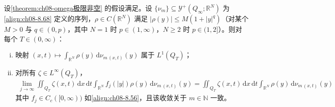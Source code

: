 \documentclass[../../main.tex]{subfiles}%
\begin{document}
\begin{lemma}[平移测度的积分收敛]\label{lemma:ch08-积分收敛}
设\cref{theorem:ch08-omega极限非空} 的假设满足。设 $\{\nu_m\}\subseteq\mathcal{Y}^+(Q_\infty;\mathbb{R}^N)$ 为\eqref{align:ch08-8.68} 定义的序列，$\rho\in C(\mathbb{R}^N)$ 满足 $|\rho(y)|\leqslant M(1+|y|^q)$（对某个 $M>0$ 与 $q\in(0,p)$，其中 $N=1$ 时 $p\in(1,\infty)$，$N\geqslant2$ 时 $p\in(1,2]$）。则对每个 $T\in(0,\infty)$：
\begin{enumerate}[(i)]
\item\label{item:ch08-intconv-i} 映射 $(x,t)\mapsto\int_{\mathbb{R}^N}\rho(y)\,\mathrm{d}\nu_{m\,(x,t)}(y)$ 属于 $L^1(Q_T)$；
\item\label{item:ch08-intconv-ii} 对所有 $\zeta\in L^\infty(Q_T)$，
\begin{align}
\lim_{j\to\infty}\iint_{Q_T}\zeta(x,t)\,\mathrm{d}x\,\mathrm{d}t\int_{\mathbb{R}^N}f_j(|y|)\rho(y)\,\mathrm{d}\nu_{m\,(x,t)}(y)
=\iint_{Q_T}\zeta(x,t)\,\mathrm{d}x\,\mathrm{d}t\int_{\mathbb{R}^N}\rho(y)\,\mathrm{d}\nu_{m\,(x,t)}(y) \label{align:ch08-8.76}
\end{align}
其中 $f_j\in C_c([0,\infty))$ 如\eqref{align:ch08-8.56}，且该收敛关于 $m\in\mathbb{N}$ 一致。
\end{enumerate}
\end{lemma}
\end{document}
